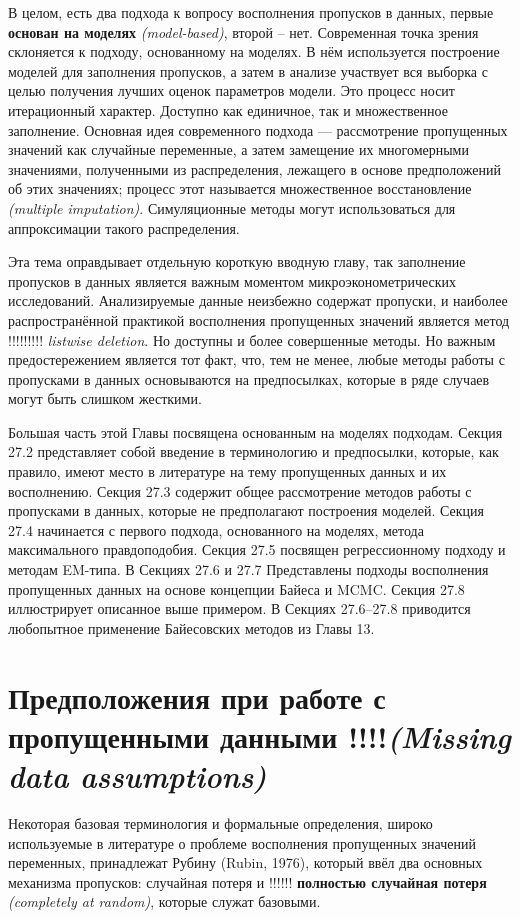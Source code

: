 В целом, есть два подхода к вопросу восполнения пропусков в данных, первые {\bf основан на моделях} \emph{(model-based)}, второй – нет. Современная точка зрения склоняется к подходу, основанному на моделях. В нём используется построение моделей для заполнения пропусков, а затем в анализе участвует вся выборка с целью получения лучших оценок параметров модели.  Это процесс носит итерационный характер. Доступно как единичное, так и множественное заполнение. Основная идея современного подхода –-- рассмотрение пропущенных значений как случайные переменные, а затем замещение их многомерными значениями, полученными из распределения, лежащего в основе предположений об этих значениях; процесс этот называется множественное восстановление \emph{(multiple imputation)}. Симуляционные методы могут использоваться для аппроксимации такого распределения.

Эта тема оправдывает отдельную короткую вводную главу, так заполнение пропусков в данных является важным моментом микроэконометрических исследований. Анализируемые данные неизбежно содержат пропуски, и наиболее распространённой практикой восполнения пропущенных значений является метод !!!!!!!!! \emph{listwise deletion}. Но доступны и более совершенные методы. Но важным предостережением является тот факт, что, тем не менее, любые методы работы с пропусками в данных основываются на предпосылках, которые в ряде случаев могут быть слишком жесткими.

Большая часть этой Главы посвящена основанным на моделях подходам. Секция 27.2 представляет собой введение в терминологию и предпосылки, которые, как правило, имеют место в литературе на тему пропущенных данных и их восполнению. Секция 27.3 содержит общее рассмотрение методов работы с пропусками в данных, которые не предполагают построения моделей. Секция 27.4 начинается с первого подхода, основанного на моделях, метода максимального правдоподобия. Секция 27.5 посвящен регрессионному подходу и методам EM-типа. В Секциях 27.6 и 27.7 Представлены подходы восполнения пропущенных данных на основе концепции Байеса и MCMC. Секция 27.8 иллюстрирует описанное выше примером. В Секциях 27.6--27.8 приводится любопытное применение Байесовских методов из Главы 13.

\section{Предположения при работе с пропущенными данными !!!!\emph{(Missing data assumptions)}}

Некоторая базовая терминология и формальные определения, широко используемые в литературе о проблеме восполнения пропущенных значений переменных, принадлежат Рубину (Rubin, 1976), который ввёл два основных механизма пропусков: случайная потеря и !!!!!! {\bf полностью случайная потеря} \emph{(completely at random)}, которые служат базовыми. 

